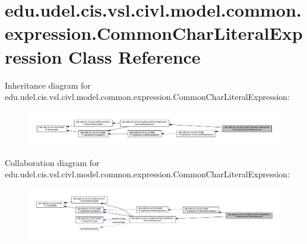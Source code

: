 \hypertarget{classedu_1_1udel_1_1cis_1_1vsl_1_1civl_1_1model_1_1common_1_1expression_1_1CommonCharLiteralExpression}{}\section{edu.\+udel.\+cis.\+vsl.\+civl.\+model.\+common.\+expression.\+Common\+Char\+Literal\+Expression Class Reference}
\label{classedu_1_1udel_1_1cis_1_1vsl_1_1civl_1_1model_1_1common_1_1expression_1_1CommonCharLiteralExpression}


Inheritance diagram for edu.\+udel.\+cis.\+vsl.\+civl.\+model.\+common.\+expression.\+Common\+Char\+Literal\+Expression\+:
\nopagebreak
\begin{figure}[H]
\begin{center}
\leavevmode
\includegraphics[width=350pt]{classedu_1_1udel_1_1cis_1_1vsl_1_1civl_1_1model_1_1common_1_1expression_1_1CommonCharLiteralExpression__inherit__graph}
\end{center}
\end{figure}


Collaboration diagram for edu.\+udel.\+cis.\+vsl.\+civl.\+model.\+common.\+expression.\+Common\+Char\+Literal\+Expression\+:
\nopagebreak
\begin{figure}[H]
\begin{center}
\leavevmode
\includegraphics[width=350pt]{classedu_1_1udel_1_1cis_1_1vsl_1_1civl_1_1model_1_1common_1_1expression_1_1CommonCharLiteralExpression__coll__graph}
\end{center}
\end{figure}
